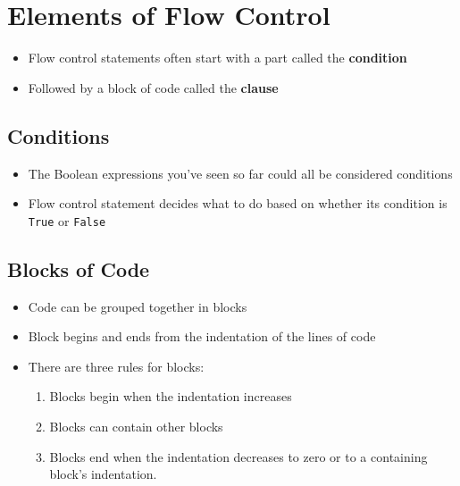 \documentclass[11pt]{article}
\providecommand{\tightlist}{%
      \setlength{\itemsep}{0pt}\setlength{\parskip}{0pt}}
\begin{document}
    \hypertarget{elements-of-flow-control}{%
\section{Elements of Flow Control}\label{elements-of-flow-control}}

\begin{itemize}
\tightlist
\item
  Flow control statements often start with a part called the
  \textbf{condition}
\item
  Followed by a block of code called the \textbf{clause}
\end{itemize}

    \hypertarget{conditions}{%
\subsection{Conditions}\label{conditions}}

\begin{itemize}
\tightlist
\item
  The Boolean expressions you've seen so far could all be considered
  conditions
\item
  Flow control statement decides what to do based on whether its
  condition is \texttt{True} or \texttt{False}
\end{itemize}

    \hypertarget{blocks-of-code}{%
\subsection{Blocks of Code}\label{blocks-of-code}}

\begin{itemize}
\item
  Code can be grouped together in blocks
\item
  Block begins and ends from the indentation of the lines of code
\item
  There are three rules for blocks:

  \begin{enumerate}
  \def\labelenumi{\arabic{enumi}.}
  \tightlist
  \item
    Blocks begin when the indentation increases
  \item
    Blocks can contain other blocks
  \item
    Blocks end when the indentation decreases to zero or to a containing
    block's indentation.
  \end{enumerate}
\end{itemize}
\end{document}
